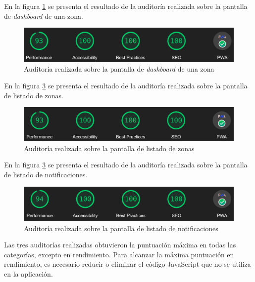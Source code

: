 En la figura \ref{fig:lighthouseDashboardZona} se presenta el resultado de la auditoría realizada sobre la pantalla de \emph{dashboard} de una zona.

\begin{figure}[H]
	\centering
	\includegraphics[width=.9\textwidth]{./Figures/Lighthouse dashboard.png}
	\caption{Auditoría realizada sobre la pantalla de \emph{dashboard} de una zona}
	\label{fig:lighthouseDashboardZona}
\end{figure}

En la figura \ref{fig:lighthouseListadoZonas} se presenta el resultado de la auditoría realizada sobre la pantalla de listado de zonas.

\begin{figure}[H]
	\centering
	\includegraphics[width=.9\textwidth]{./Figures/Lighthouse zonas.png}
	\caption{Auditoría realizada sobre la pantalla de listado de zonas}
	\label{fig:lighthouseListadoZonas}
\end{figure}

En la figura \ref{fig:lighthouseListadoZonas} se presenta el resultado de la auditoría realizada sobre la pantalla de listado de notificaciones.

\begin{figure}[H]
	\centering
	\includegraphics[width=.9\textwidth]{./Figures/Lighthouse notificaciones.png}
	\caption{Auditoría realizada sobre la pantalla de listado de notificaciones}
	\label{fig:lighthouseListadoZonas}
\end{figure}

Las tres auditorías realizadas obtuvieron la puntuación máxima en todas las categorías, excepto en rendimiento. Para alcanzar la máxima puntuación en rendimiento, es necesario reducir o eliminar el código JavaScript que no se utiliza en la aplicación.
 
